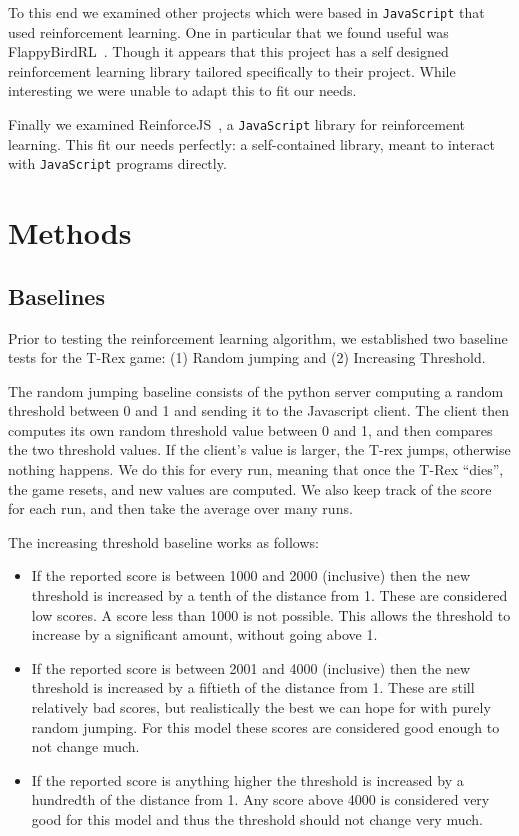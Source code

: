 \documentclass{scrartcl}
\begin{document}
To this end we examined other projects which were based in \texttt{JavaScript}
that used reinforcement learning. One in particular that we found useful was
FlappyBirdRL~\cite{flappybirdrl}. Though it appears that this project has a self
designed reinforcement learning library tailored specifically to their project.
While interesting we were unable to adapt this to fit our needs.

Finally we examined ReinforceJS~\cite{reinforcejs}, a \texttt{JavaScript}
library for reinforcement learning. This fit our needs perfectly: a
self-contained library, meant to interact with \texttt{JavaScript} programs
directly.
\nocite{rlblogex}

\section{Methods}

    \subsection{Baselines}
    Prior to testing the reinforcement learning algorithm, we established two baseline tests for the T-Rex game: (1) Random jumping and (2) Increasing Threshold.

    \par The random jumping baseline consists of the python server computing a random threshold between 0 and 1 and sending it to the Javascript client. The client then computes its own random threshold value between 0 and 1, and then compares the two threshold values. If the client's value is larger, the T-rex jumps, otherwise nothing happens. We do this for every run, meaning that once the T-Rex ``dies'', the game resets, and new values are computed. We also keep track of the score for each run, and then take the average over many runs.

    \par The increasing threshold baseline works as follows:

    \begin{itemize}
      \item If the reported score is between 1000 and 2000 (inclusive) then the new
        threshold is increased by a tenth of the distance from 1. These are
        considered low scores. A score less than 1000 is not possible. This allows
        the threshold to increase by a significant amount, without going above 1.
      \item If the reported score is between 2001 and 4000 (inclusive) then the new
        threshold is increased by a fiftieth of the distance from 1. These are still
        relatively bad scores, but realistically the best we can hope for with
        purely random jumping. For this model these scores are considered good
        enough to not change much.
      \item If the reported score is anything higher the threshold is increased by a
        hundredth of the distance from 1. Any score above 4000 is considered very
        good for this model and thus the threshold should not change very much.
    \end{itemize}
\end{document}
